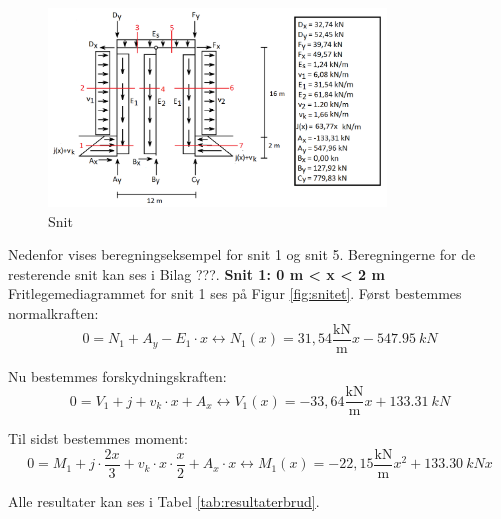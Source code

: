 \begin{figure}[H]
	\centering
	\includegraphics[width=0.8\textwidth]{billeder/snitbrud.png}
	\caption{Snit}
	\label{fig:snitbrud}
\end{figure}

Nedenfor vises beregningseksempel for snit 1 og snit 5. Beregningerne for de resterende snit kan ses i Bilag ???. 
\newline
\newline
\textbf{Snit 1: 0 m < x < 2 m}
\newline
Fritlegemediagrammet for snit 1 ses på Figur \ref{fig:snitet}.
\newline
\newline
Først bestemmes normalkraften:
\begin{equation}
	0 = N_1 + A_y - E_1 \cdot x \leftrightarrow N_1(x) = 31,\!54 \frac{\text{kN}}{\text{m}} x - \SI{547,95}{kN}
\end{equation}

Nu bestemmes forskydningskraften:
\begin{equation}
	0 = V_1 + j + v_k \cdot x + A_x \leftrightarrow V_1(x) = -33,\!64\frac{\text{kN}}{\text{m}} x + \SI{133,31}{kN}
\end{equation}

Til sidst bestemmes moment:
\begin{equation}
	0 = M_1 + j \cdot \frac{2x}{3} + v_k \cdot x \cdot \frac{x}{2} + A_x \cdot x \leftrightarrow M_1(x) = -22,\!15\frac{\text{kN}}{\text{m}} x^2 + \SI{133,30}{kN} x
\end{equation}

Alle resultater kan ses i Tabel \ref{tab:resultaterbrud}.

